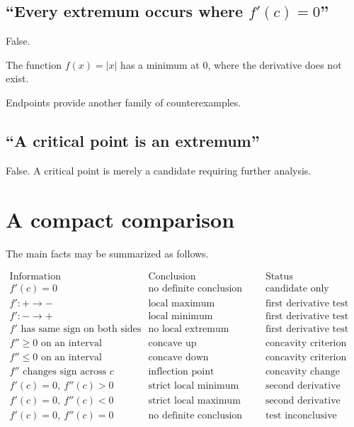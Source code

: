 \documentclass{essay}
\begin{document}
\subsection{\texorpdfstring{``Every extremum occurs where \(f'(c)=0\)''}{``Every extremum occurs where f'(c)=0''}}

False.

The function \(f(x)=|x|\) has a minimum at \(0\), where the derivative does not exist.

Endpoints provide another family of counterexamples.

\subsection{``A critical point is an extremum''}

False. A critical point is merely a candidate requiring further analysis.

\section{A compact comparison}

The main facts may be summarized as follows.

\[
  \begin{array}{c|c|c}
    \text{Information} & \text{Conclusion} & \text{Status}\\
    \hline
    f'(c)=0
    & \text{no definite conclusion}
    & \text{candidate only}\\[4pt]
    f':+\to-
    & \text{local maximum}
    & \text{first derivative test}\\[4pt]
    f':-\to+
    & \text{local minimum}
    & \text{first derivative test}\\[4pt]
    f' \text{ has same sign on both sides}
    & \text{no local extremum}
    & \text{first derivative test}\\[4pt]
    f''\geq0 \text{ on an interval}
    & \text{concave up}
    & \text{concavity criterion}\\[4pt]
    f''\leq0 \text{ on an interval}
    & \text{concave down}
    & \text{concavity criterion}\\[4pt]
    f'' \text{ changes sign across } c
    & \text{inflection point candidate}
    & \text{concavity change}\\[4pt]
    f'(c)=0,\ f''(c)>0
    & \text{strict local minimum}
    & \text{second derivative test}\\[4pt]
    f'(c)=0,\ f''(c)<0
    & \text{strict local maximum}
    & \text{second derivative test}\\[4pt]
    f'(c)=0,\ f''(c)=0
    & \text{no definite conclusion}
    & \text{test inconclusive}
  \end{array}
\]
\end{document}
